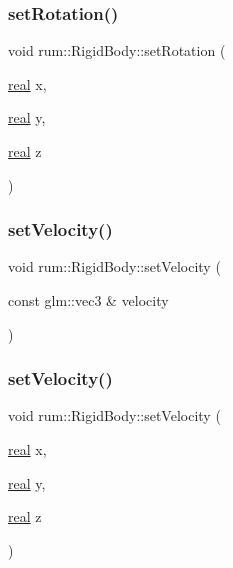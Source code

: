 \subsubsection{\texorpdfstring{set\+Rotation()}{setRotation()}\hspace{0.1cm}{\footnotesize\ttfamily [2/2]}}
{\footnotesize\ttfamily void rum\+::\+Rigid\+Body\+::set\+Rotation (\begin{DoxyParamCaption}\item[{\mbox{\hyperlink{namespacerum_a7e8cca23573d5eaead0f138cbaa4862c}{real}}}]{x,  }\item[{\mbox{\hyperlink{namespacerum_a7e8cca23573d5eaead0f138cbaa4862c}{real}}}]{y,  }\item[{\mbox{\hyperlink{namespacerum_a7e8cca23573d5eaead0f138cbaa4862c}{real}}}]{z }\end{DoxyParamCaption})}

\mbox{\label{classrum_1_1_rigid_body_a807a0309fef97be32db6f1e981e2f029}} 
\subsubsection{\texorpdfstring{set\+Velocity()}{setVelocity()}\hspace{0.1cm}{\footnotesize\ttfamily [1/2]}}
{\footnotesize\ttfamily void rum\+::\+Rigid\+Body\+::set\+Velocity (\begin{DoxyParamCaption}\item[{const glm\+::vec3 \&}]{velocity }\end{DoxyParamCaption})}

\mbox{\label{classrum_1_1_rigid_body_abca9a7836044d66793a26584a06cf58b}} 
\subsubsection{\texorpdfstring{set\+Velocity()}{setVelocity()}\hspace{0.1cm}{\footnotesize\ttfamily [2/2]}}
{\footnotesize\ttfamily void rum\+::\+Rigid\+Body\+::set\+Velocity (\begin{DoxyParamCaption}\item[{\mbox{\hyperlink{namespacerum_a7e8cca23573d5eaead0f138cbaa4862c}{real}}}]{x,  }\item[{\mbox{\hyperlink{namespacerum_a7e8cca23573d5eaead0f138cbaa4862c}{real}}}]{y,  }\item[{\mbox{\hyperlink{namespacerum_a7e8cca23573d5eaead0f138cbaa4862c}{real}}}]{z }\end{DoxyParamCaption})}


